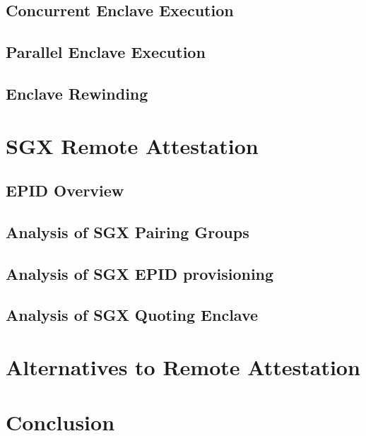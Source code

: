 \documentclass[11pt]{article}
\begin{document}
  \subsection{Concurrent Enclave Execution}
  \subsection{Parallel Enclave Execution}
  \subsection{Enclave Rewinding}

  \section{SGX Remote Attestation}
  \subsection{EPID Overview}
  \subsection{Analysis of SGX Pairing Groups}
  \subsection{Analysis of SGX EPID provisioning}
  \subsection{Analysis of SGX Quoting Enclave}

  \section{Alternatives to Remote Attestation}
  \section{Conclusion}



\end{document}
